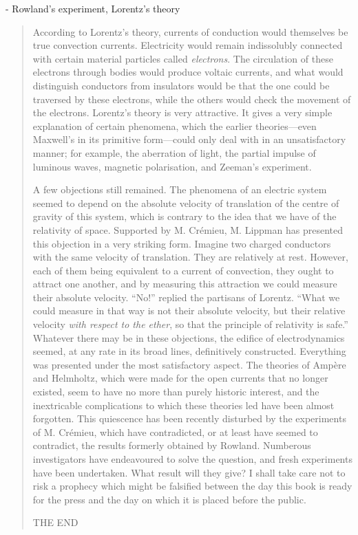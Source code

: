 \documentclass{article}
\begin{document}
- Rowland's experiment, Lorentz's theory

\begin{quote}
    According to Lorentz's theory, currents of conduction would themselves be true convection currents.  Electricity would remain indissolubly connected with certain material particles called \emph{electrons}.  The circulation of these electrons through bodies would produce voltaic currents, and what would distinguish conductors from insulators would be that the one could be traversed by these electrons, while the others would check the movement of the electrons.  Lorentz's theory is very attractive.  It gives a very simple explanation of certain phenomena, which the earlier theories---even Maxwell's in its primitive form---could only deal with in an unsatisfactory manner; for example, the aberration of light, the partial impulse of luminous waves, magnetic polarisation, and Zeeman's experiment.  
    
    A few objections still remained.  The phenomena of an electric system seemed to depend on the absolute velocity of translation of the centre of gravity of this system, which is contrary to the idea that we have of the relativity of space.  Supported by M. Cr\'emieu, M. Lippman has presented this objection in a very striking form.  Imagine two charged conductors with the same velocity of translation.  They are relatively at rest.  However, each of them being equivalent to a current of convection, they ought to attract one another, and by measuring this attraction we could measure their absolute velocity.  ``No!'' replied the partisans of Lorentz.  ``What we could measure in that way is not their absolute velocity, but their relative velocity \emph{with respect to the ether}, so that the principle of relativity is safe.''  Whatever there may be in these objections, the edifice of electrodynamics seemed, at any rate in its broad lines, definitively constructed.  Everything was presented under the most satisfactory aspect.  The theories of Amp\`ere and Helmholtz, which were made for the open currents that no longer existed, seem to have no more than purely historic interest, and the inextricable complications to which these theories led have been almost forgotten.  This quiescence has been recently disturbed by the experiments of M. Cr\'emieu, which have contradicted, or at least have seemed to contradict, the results formerly obtained by Rowland.  Numberous investigators have endeavoured to solve the question, and fresh experiments have been undertaken.  What result will they give?  I shall take care not to risk a prophecy which might be falsified between the day this book is ready for the press and the day on which it is placed before the public.  
    
    THE END
    
    \citep[p. 242-244]{Poincare1952}
    
    
\end{quote}
\end{document}
